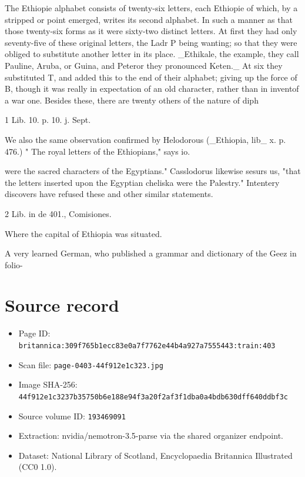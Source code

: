 \documentclass{article}
\begin{document}
The Ethiopie alphabet consists of twenty-six letters, each Ethiopie of which, by a stripped or point emerged, writes its second alphabet. In such a manner as that those twenty-six forms as it were sixty-two distinct letters. At first they had only seventy-five of these original letters, the Ladr P being wanting; so that they were obliged to substitute another letter in its place. \_Ethikale, the example, they call Pauline, Aruba, or Guina, and Peteror they pronounced Keten.\_ At six they substituted T, and added this to the end of their alphabet; giving up the force of B, though it was really in expectation of an old character, rather than in inventof a war one. Besides these, there are twenty others of the nature of diph

1 Lib. 10. p. 10. j. Sept.

We also the same observation confirmed by Helodorous (\_Ethiopia, lib\_ x. p. 476.) " The royal letters of the Ethiopians," says io.

were the sacred characters of the Egyptians." Casslodorus likewise sesurs us, "that the letters inserted upon the Egyptian cheliska were the Palestry." Intentery discovers have refused these and other similar statements.

2 Lib. in de 401., Comisiones.

Where the capital of Ethiopia was situated.

A very learned German, who published a grammar and dictionary of the Geez in folio-

\section*{Source record}
\begin{itemize}
\item Page ID: \texttt{britannica:309f765b1ecc83e0a7f7762e44b4a927a7555443:train:403}
\item Scan file: \texttt{page-0403-44f912e1c323.jpg}
\item Image SHA-256: \texttt{44f912e1c3237b35750b6e188e94f3a20f2af3f1dba0a4bdb630dff640ddbf3c}
\item Source volume ID: \texttt{193469091}
\item Extraction: nvidia/nemotron-3.5-parse via the shared organizer endpoint.
\item Dataset: National Library of Scotland, Encyclopaedia Britannica Illustrated (CC0 1.0).
\end{itemize}
\end{document}
